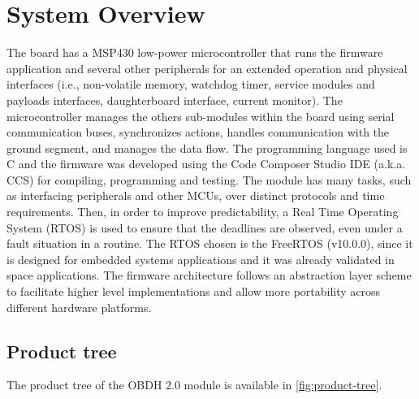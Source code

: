 %
%
%
%
%

%
%
%
%
%
%

\chapter{System Overview} \label{ch:system-overview}

The board has a MSP430 low-power microcontroller that runs the firmware application and several other peripherals for an extended operation and physical interfaces (i.e., non-volatile memory, watchdog timer, service modules and payloads interfaces, daughterboard interface, current monitor). The microcontroller manages the others sub-modules within the board using serial communication buses, synchronizes actions, handles communication with the ground segment, and manages the data flow. The programming language used is C and the firmware was developed using the Code Composer Studio IDE (a.k.a. CCS) for compiling, programming and testing. The module has many tasks, such as interfacing peripherals and other MCUs, over distinct protocols and time requirements. Then, in order to improve predictability, a Real Time Operating System (RTOS) is used to ensure that the deadlines are observed, even under a fault situation in a routine. The RTOS chosen is the FreeRTOS (v10.0.0), since it is designed for embedded systems applications and it was already validated in space applications. The firmware architecture follows an abstraction layer scheme to facilitate higher level implementations and allow more portability across different hardware platforms.

\section{Product tree}

The product tree of the OBDH 2.0 module is available in \autoref{fig:product-tree}.

